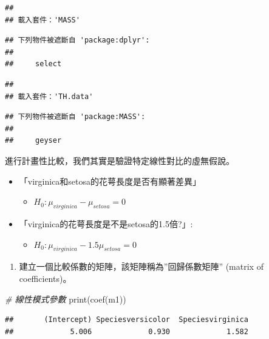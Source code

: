 \documentclass[
]{book}
\newenvironment{Shaded}{\begin{snugshade}}{\end{snugshade}}
\newcommand{\CommentTok}[1]{\textcolor[rgb]{0.56,0.35,0.01}{\textit{#1}}}
\newcommand{\FunctionTok}[1]{\textcolor[rgb]{0.00,0.00,0.00}{#1}}
\newcommand{\NormalTok}[1]{#1}
\providecommand{\tightlist}{%
  \setlength{\itemsep}{0pt}\setlength{\parskip}{0pt}}
\begin{document}
\begin{verbatim}
## 
## 載入套件：'MASS'
\end{verbatim}

\begin{verbatim}
## 下列物件被遮斷自 'package:dplyr':
## 
##     select
\end{verbatim}

\begin{verbatim}
## 
## 載入套件：'TH.data'
\end{verbatim}

\begin{verbatim}
## 下列物件被遮斷自 'package:MASS':
## 
##     geyser
\end{verbatim}

進行計畫性比較，我們其實是驗證特定線性對比的虛無假說。

\begin{itemize}
\tightlist
\item
  「virginica和setosa的花萼長度是否有顯著差異」

  \begin{itemize}
  \tightlist
  \item
    \(H_0:\mu_{virginica}-\mu_{setosa}=0\)
  \end{itemize}
\item
  「virginica的花萼長度是不是setosa的1.5倍?」:

  \begin{itemize}
  \tightlist
  \item
    \(H_0:\mu_{virginica}-1.5\mu_{setosa}=0\)
  \end{itemize}
\end{itemize}

\begin{enumerate}
\def\labelenumi{\arabic{enumi}.}
\tightlist
\item
  建立一個比較係數的矩陣，該矩陣稱為''回歸係數矩陣'' (matrix of coefficients)。
\end{enumerate}

\begin{Shaded}
\begin{Highlighting}[]
\CommentTok{\# 線性模式參數}
\FunctionTok{print}\NormalTok{(}\FunctionTok{coef}\NormalTok{(m1))}
\end{Highlighting}
\end{Shaded}

\begin{verbatim}
##       (Intercept) Speciesversicolor  Speciesvirginica 
##             5.006             0.930             1.582
\end{verbatim}
\end{document}
